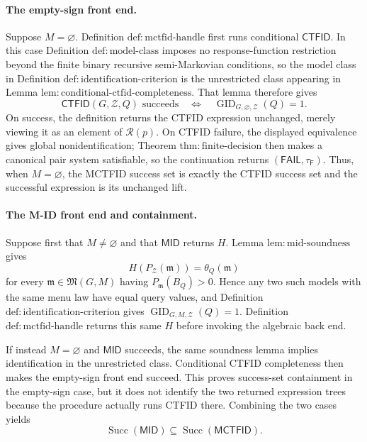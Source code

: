 \paragraph{The empty-sign front end.}
Suppose \(M=\varnothing\).  Definition \(\mathrm{def:mctfid\text{-}handle}\) first runs conditional \(\mathsf{CTFID}\).  In this case Definition \(\mathrm{def:model\text{-}class}\) imposes no response-function restriction beyond the finite binary recursive semi-Markovian conditions, so the model class in Definition \(\mathrm{def:identification\text{-}criterion}\) is the unrestricted class appearing in Lemma \(\mathrm{lem:conditional\text{-}ctfid\text{-}completeness}\).  That lemma therefore gives
\[
 \mathsf{CTFID}(G,\mathcal Z,Q)\text{ succeeds}
 \quad\Longleftrightarrow\quad
 \operatorname{GID}_{G,\varnothing,\mathcal Z}(Q)=1.
\]
On success, the definition returns the CTFID expression unchanged, merely viewing it as an element of \(\mathcal R(p)\).  On CTFID failure, the displayed equivalence gives global nonidentification; Theorem \(\mathrm{thm:finite\text{-}decision}\) then makes a canonical pair system satisfiable, so the continuation returns \((\mathsf{FAIL},\tau_{\mathsf F})\).  Thus, when \(M=\varnothing\), the MCTFID success set is exactly the CTFID success set and the successful expression is its unchanged lift.

\paragraph{The M-ID front end and containment.}
Suppose first that \(M\ne\varnothing\) and that \(\mathsf{MID}\) returns \(H\).  Lemma \(\mathrm{lem:mid\text{-}soundness}\) gives
\[
 H(P_{\mathcal Z}(\mathfrak m))=\theta_Q(\mathfrak m)
\]
for every \(\mathfrak m\in\mathfrak M(G,M)\) having \(P_{\mathfrak m}(B_Q)>0\).  Hence any two such models with the same menu law have equal query values, and Definition \(\mathrm{def:identification\text{-}criterion}\) gives \(\operatorname{GID}_{G,M,\mathcal Z}(Q)=1\).  Definition \(\mathrm{def:mctfid\text{-}handle}\) returns this same \(H\) before invoking the algebraic back end.

If instead \(M=\varnothing\) and \(\mathsf{MID}\) succeeds, the same soundness lemma implies identification in the unrestricted class.  Conditional CTFID completeness then makes the empty-sign front end succeed.  This proves success-set containment in the empty-sign case, but it does not identify the two returned expression trees because the procedure actually runs CTFID there.  Combining the two cases yields
\[
 \operatorname{Succ}(\mathsf{MID})
 \subseteq \operatorname{Succ}(\mathsf{MCTFID}).
\]

